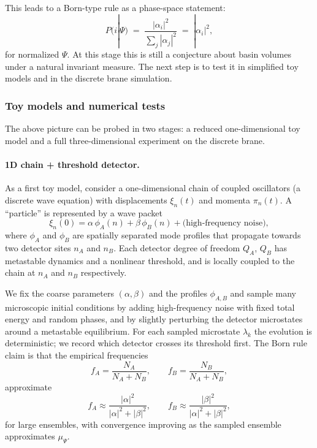 This leads to a Born-type rule as a phase-space statement:
\begin{equation}
  P(i|\Psi) \;=\;
  \frac{|\alpha_i|^2}{\sum_j |\alpha_j|^2}
  \;=\; |\alpha_i|^2,
\end{equation}
for normalized $\Psi$.
At this stage this is still a conjecture about basin volumes under a natural invariant measure.
The next step is to test it in simplified toy models and in the discrete brane simulation.

\subsubsection{Toy models and numerical tests}
\label{sec:born-experiments}

The above picture can be probed in two stages: a reduced one-dimensional toy model and a full three-dimensional experiment on the discrete brane.

\paragraph{1D chain + threshold detector.}

As a first toy model, consider a one-dimensional chain of coupled oscillators (a discrete wave equation) with displacements $\xi_n(t)$ and momenta $\pi_n(t)$.
A ``particle'' is represented by a wave packet
\begin{equation}
  \xi_n(0) = \alpha\, \phi_A(n) + \beta\, \phi_B(n) + \text{(high-frequency noise)},
\end{equation}
where $\phi_A$ and $\phi_B$ are spatially separated mode profiles that propagate towards two detector sites $n_A$ and $n_B$.
Each detector degree of freedom $Q_A$, $Q_B$ has metastable dynamics and a nonlinear threshold, and is locally coupled to the chain at $n_A$ and $n_B$ respectively.

We fix the coarse parameters $(\alpha,\beta)$ and the profiles $\phi_{A,B}$ and sample many microscopic initial conditions by adding high-frequency noise with fixed total energy and random phases, and by slightly perturbing the detector microstates around a metastable equilibrium.
For each sampled microstate $\lambda_k$ the evolution is deterministic; we record which detector crosses its threshold first.
The Born rule claim is that the empirical frequencies
\begin{equation}
  f_A = \frac{N_A}{N_A + N_B},
  \qquad
  f_B = \frac{N_B}{N_A + N_B},
\end{equation}
approximate
\begin{equation}
  f_A \approx \frac{|\alpha|^2}{|\alpha|^2 + |\beta|^2},
  \qquad
  f_B \approx \frac{|\beta|^2}{|\alpha|^2 + |\beta|^2},
\end{equation}
for large ensembles, with convergence improving as the sampled ensemble approximates $\mu_\Psi$.

